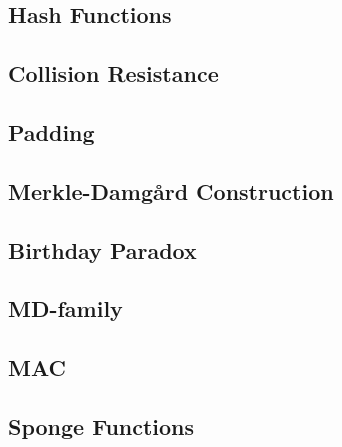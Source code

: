 \subsection{Hash Functions}

\subsection{Collision Resistance}

\subsection{Padding}

\subsection{Merkle-Damg\aa rd Construction}

\subsection{Birthday Paradox}

\subsection{MD-family}

\subsection{MAC}

\subsection{Sponge Functions}